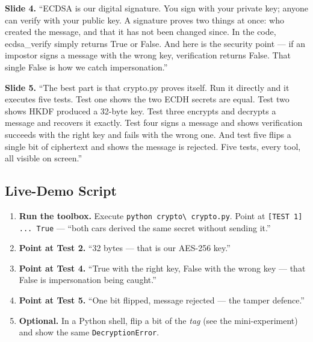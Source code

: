 \documentclass[11pt,a4paper]{article}
\begin{document}
\textbf{Slide 4.} ``ECDSA is our digital signature. You sign with your private
key; anyone can verify with your public key. A signature proves two things at
once: who created the message, and that it has not been changed since. In the
code, ecdsa\_verify simply returns True or False. And here is the security point
--- if an impostor signs a message with the wrong key, verification returns
False. That single False is how we catch impersonation.''

\textbf{Slide 5.} ``The best part is that crypto.py proves itself. Run it
directly and it executes five tests. Test one shows the two ECDH secrets are
equal. Test two shows HKDF produced a 32-byte key. Test three encrypts and
decrypts a message and recovers it exactly. Test four signs a message and shows
verification succeeds with the right key and fails with the wrong one. And test
five flips a single bit of ciphertext and shows the message is rejected. Five
tests, every tool, all visible on screen.''

\subsection{Live-Demo Script}
\begin{enumerate}
  \item \textbf{Run the toolbox.} Execute \texttt{python crypto\textbackslash
        crypto.py}. Point at \texttt{[TEST 1] ... True} --- ``both cars derived
        the same secret without sending it.''
  \item \textbf{Point at Test 2.} ``32 bytes --- that is our AES-256 key.''
  \item \textbf{Point at Test 4.} ``True with the right key, False with the
        wrong key --- that False is impersonation being caught.''
  \item \textbf{Point at Test 5.} ``One bit flipped, message rejected --- the
        tamper defence.''
  \item \textbf{Optional.} In a Python shell, flip a bit of the \emph{tag} (see
        the mini-experiment) and show the same \texttt{DecryptionError}.
\end{enumerate}
\end{document}

